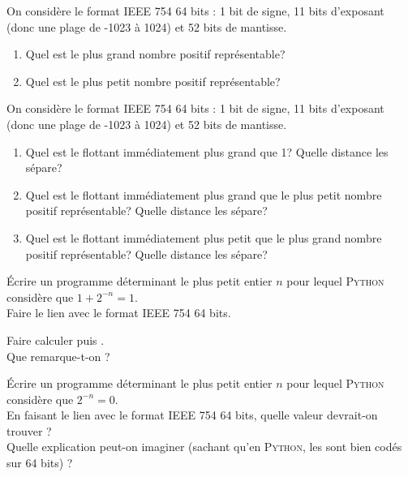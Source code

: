 \begin{exercice}
    On considère le format IEEE 754 64 bits : 1 bit de signe, 11 bits d'exposant (donc une plage de -1023 à 1024) et 52 bits de
    mantisse.
    \begin{enumerate}
        \item 	Quel est le plus grand nombre positif représentable?
        \item 	Quel est le plus petit nombre positif représentable?
    \end{enumerate}
\end{exercice}

\begin{exercice}
    On considère le format IEEE 754 64 bits : 1 bit de signe, 11 bits d'exposant (donc une plage de -1023 à 1024) et 52 bits de
    mantisse.
    \begin{enumerate}
        \item 	Quel est le flottant immédiatement plus grand que 1? Quelle distance les sépare?
        \item 	Quel est le flottant immédiatement plus grand que le plus petit nombre positif représentable? Quelle distance les sépare?
        \item 	Quel est le flottant immédiatement plus petit que le plus grand nombre positif représentable? Quelle distance les sépare?
    \end{enumerate}
\end{exercice}

\begin{exercice}
    \'Ecrire un programme déterminant le plus petit entier $n$ pour lequel \textsc{Python} considère que $1+2^{-n}=1$.\\
    Faire le lien avec le format IEEE 754 64 bits.
\end{exercice}

\begin{exercice}
    Faire calculer  puis .\\
    Que remarque-t-on ?\\
\end{exercice}

\begin{exercice}
    \'Ecrire un programme déterminant le plus petit entier $n$ pour lequel \textsc{Python} considère que $2^{-n}=0$.\\
    En faisant le lien avec le format IEEE 754 64 bits, quelle valeur devrait-on trouver ?\\
    Quelle explication peut-on imaginer (sachant qu'en \textsc{Python}, les  sont bien codés sur 64 bits) ?
\end{exercice}

